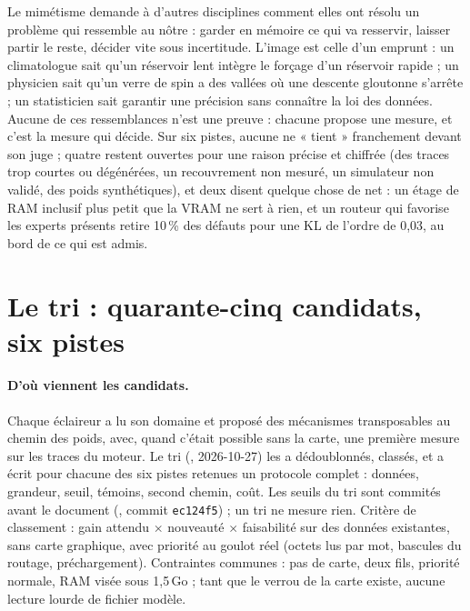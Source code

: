 \begin{enbref}
Le mimétisme demande à d'autres disciplines comment elles ont résolu un problème qui ressemble au nôtre : garder en mémoire ce qui va resservir, laisser partir le reste, décider vite sous incertitude. L'image est celle d'un emprunt : un climatologue sait qu'un réservoir lent intègre le forçage d'un réservoir rapide ; un physicien sait qu'un verre de spin a des vallées où une descente gloutonne s'arrête ; un statisticien sait garantir une précision sans connaître la loi des données. Aucune de ces ressemblances n'est une preuve : chacune propose une mesure, et c'est la mesure qui décide. Sur six pistes, aucune ne « tient » franchement devant son juge ; quatre restent ouvertes pour une raison précise et chiffrée (des traces trop courtes ou dégénérées, un recouvrement non mesuré, un simulateur non validé, des poids synthétiques), et deux disent quelque chose de net : un étage de RAM inclusif plus petit que la VRAM ne sert à rien, et un routeur qui favorise les experts présents retire 10\,\% des défauts pour une KL de l'ordre de 0,03, au bord de ce qui est admis.
\end{enbref}

\section{Le tri : quarante-cinq candidats, six pistes}\label{t3mim:sec:tri}

\paragraph{D'où viennent les candidats.} Chaque éclaireur a lu son domaine et proposé des mécanismes transposables au chemin des poids, avec, quand c'était possible sans la carte, une première mesure sur les traces du moteur. Le tri (, 2026-10-27) les a dédoublonnés, classés, et a écrit pour chacune des six pistes retenues un protocole complet : données, grandeur, seuil, témoins, second chemin, coût. Les seuils du tri sont commités avant le document (, commit \texttt{ec124f5}) ; un tri ne mesure rien. Critère de classement : gain attendu $\times$ nouveauté $\times$ faisabilité sur des données existantes, sans carte graphique, avec priorité au goulot réel (octets lus par mot, bascules du routage, préchargement). Contraintes communes : pas de carte, deux fils, priorité normale, RAM visée sous 1,5\,Go ; tant que le verrou de la carte existe, aucune lecture lourde de fichier modèle.


